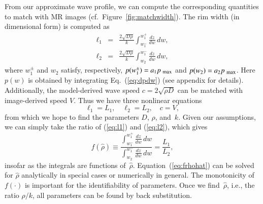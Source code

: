 \documentclass{aims}
\numberwithin{equation}{section}
\begin{document}
From our approximate wave profile, we can compute the corresponding
quantities to match with MR images (cf.\ Figure~\ref{fig:matchwidth}). The
rim width (in dimensional form) is computed as
\begin{subequations}
\begin{eqnarray}
\ell_{1} & = & \frac{2\sqrt{D\rho}}{k}
  \int_{w_{1}^{-}}^{w_{1}^+} \frac{dz}{dw} \,dw,\label{eq:l1}\\
\ell_{2} & = & \frac{2\sqrt{D\rho}}{k}
  \int_{w_{2}}^{w_{1}^-} \frac{dz}{dw}\, dw,\label{eq:l2}
\end{eqnarray}
\end{subequations}
where $w_{1}^{\pm}$ and $w_{2}$ satisfy, respectively,
$p(w_{1}^{\pm})=a_{1}p_{\mbox{\scriptsize max}}$ and
$p(w_{2})=a_{2}p_{\mbox{\scriptsize max}}$.  Here
$p(w)$ is obtained by integrating Eq.~(\ref{eq:dpdw}) (see appendix for details).
Additionally, the model-derived wave speed $c=2\sqrt{\rho D}$
can be matched with image-derived speed
$V$. Thus we have three nonlinear equations
\begin{equation}
\ell_{1}=L_{1},\quad \ell_{2}=L_{2},\quad c=V,
\label{eq:l1l2c}
\end{equation}
from which we hope to find the parameters $D$, $\rho$, and~$k$.  Given our
assumptions, we can simply take the ratio of
(\ref{eq:l1}) and (\ref{eq:l2}), which gives
\begin{equation}
f(\hat{\rho})\equiv
\frac{\displaystyle\int_{w_{1}^{-}}^{w_{1}^{+}}\frac{dz}{dw}\,dw}
  {\displaystyle\int_{w_{2}}^{w_{1}^{-}}\frac{dz}{dw}\,dw}=
  \frac{L_{1}}{L_{2}},
\label{eq:frhohat}
\end{equation}
insofar as the integrals are functions of~$\hat{\rho}$. 
Equation~(\ref{eq:frhohat})
can be solved for $\hat{\rho}$ analytically in special cases or numerically
in general.  The monotonicity of $f(\cdot)$ is important
for the identifiability of parameters. Once we find~$\hat{\rho}$, i.e., the ratio 
$\rho/k$, all parameters can be found by back substitution.
\end{document}
